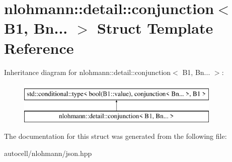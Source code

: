 \hypertarget{structnlohmann_1_1detail_1_1conjunction_3_01_b1_00_01_bn_8_8_8_01_4}{}\section{nlohmann\+:\+:detail\+:\+:conjunction$<$ B1, Bn... $>$ Struct Template Reference}
\label{structnlohmann_1_1detail_1_1conjunction_3_01_b1_00_01_bn_8_8_8_01_4}
Inheritance diagram for nlohmann\+:\+:detail\+:\+:conjunction$<$ B1, Bn... $>$\+:\begin{figure}[H]
\begin{center}
\leavevmode
\includegraphics[height=2.000000cm]{structnlohmann_1_1detail_1_1conjunction_3_01_b1_00_01_bn_8_8_8_01_4}
\end{center}
\end{figure}


The documentation for this struct was generated from the following file\+:\begin{DoxyCompactItemize}
\item 
autocell/nlohmann/json.\+hpp\end{DoxyCompactItemize}
